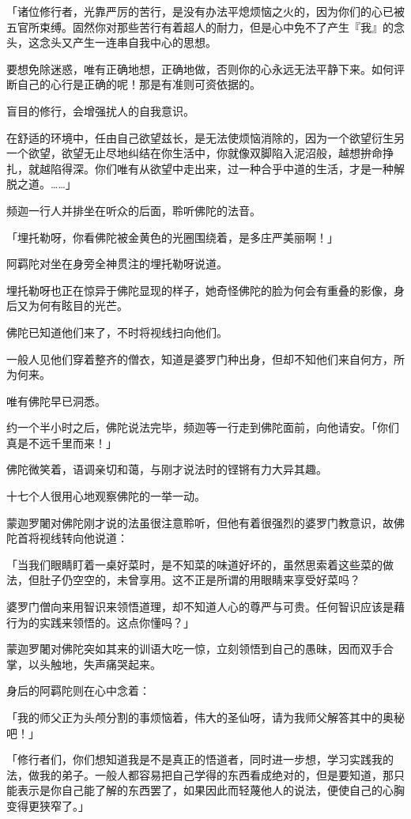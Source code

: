 \documentclass[twoside,openany]{book}
\begin{document}
「诸位修行者，光靠严厉的苦行，是没有办法平熄烦恼之火的，因为你们的心已被五官所束缚。固然你对那些苦行有着超人的耐力，但是心中免不了产生『我』的念头，这念头又产生一连串自我中心的思想。

要想免除迷惑，唯有正确地想，正确地做，否则你的心永远无法平静下来。如何评断自己的心行是正确的呢！那是有准则可资依据的。

盲目的修行，会增强扰人的自我意识。

在舒适的环境中，任由自己欲望兹长，是无法使烦恼消除的，因为一个欲望衍生另一个欲望，欲望无止尽地纠结在你生活中，你就像双脚陷入泥沼般，越想拚命挣扎，就越陷得深。你们唯有从欲望中走出来，过一种合乎中道的生活，才是一种解脱之道。……」

频迦一行人并排坐在听众的后面，聆听佛陀的法音。

「埋托勒呀，你看佛陀被金黄色的光圈围绕着，是多庄严美丽啊！」

阿羁陀对坐在身旁全神贯注的埋托勒呀说道。

埋托勒呀也正在惊异于佛陀显现的样子，她奇怪佛陀的脸为何会有重叠的影像，身后又为何有眩目的光芒。

佛陀已知道他们来了，不时将视线扫向他们。

一般人见他们穿着整齐的僧衣，知道是婆罗门种出身，但却不知他们来自何方，所为何来。

唯有佛陀早已洞悉。

约一个半小时之后，佛陀说法完毕，频迦等一行走到佛陀面前，向他请安。「你们真是不远千里而来！」

佛陀微笑着，语调亲切和蔼，与刚才说法时的铿锵有力大异其趣。

十七个人很用心地观察佛陀的一举一动。

蒙迦罗闍对佛陀刚才说的法虽很注意聆听，但他有着很强烈的婆罗门教意识，故佛陀首将视线转向他说道：

「当我们眼睛盯着一桌好菜时，是不知菜的味道好坏的，虽然思索着这些菜的做法，但肚子仍空空的，未曾享用。这不正是所谓的用眼睛来享受好菜吗？

婆罗门僧向来用智识来领悟道理，却不知道人心的尊严与可贵。任何智识应该是藉行为的实践来领悟的。这点你懂吗？」

蒙迦罗闍对佛陀突如其来的训语大吃一惊，立刻领悟到自己的愚昧，因而双手合掌，以头触地，失声痛哭起来。

身后的阿羁陀则在心中念着：

「我的师父正为头颅分割的事烦恼着，伟大的圣仙呀，请为我师父解答其中的奥秘吧！」

「修行者们，你们想知道我是不是真正的悟道者，同时进一步想，学习实践我的法，做我的弟子。一般人都容易把自己学得的东西看成绝对的，但是要知道，那只能表示是你自己能了解的东西罢了，如果因此而轻蔑他人的说法，便使自己的心胸变得更狭窄了。」
\end{document}
